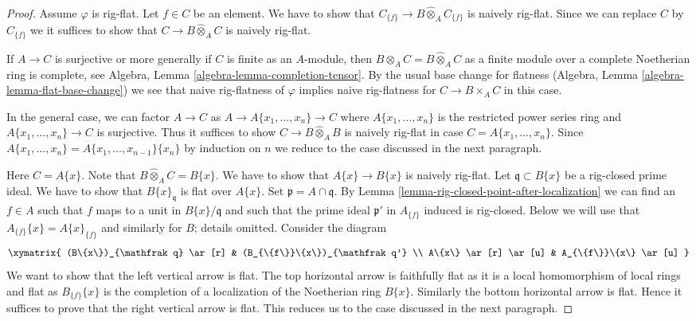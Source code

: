 \begin{proof}
Assume $\varphi$ is rig-flat. Let $f \in C$ be an element.
We have to show that
$C_{\{f\}} \to B \widehat{\otimes}_A C_{\{f\}}$
is naively rig-flat. Since we can replace $C$ by $C_{\{f\}}$
we it suffices to show that $C \to B \widehat{\otimes}_A C$
is naively rig-flat.

\medskip\noindent
If $A \to C$ is surjective or more generally if $C$ is finite as
an $A$-module, then $B \otimes_A C = B \widehat{\otimes}_A C$
as a finite module over a complete Noetherian ring is complete, see
Algebra, Lemma \ref{algebra-lemma-completion-tensor}.
By the usual base change for flatness
(Algebra, Lemma \ref{algebra-lemma-flat-base-change})
we see that naive rig-flatness of $\varphi$ implies naive rig-flatness
for $C \to B \times_A C$ in this case.

\medskip\noindent
In the general case, we can factor $A \to C$ as
$A \to A\{x_1, \ldots, x_n\} \to C$
where $A\{x_1, \ldots, x_n\}$ is the restricted power series ring
and $A\{x_1, \ldots, x_n\} \to C$ is surjective. Thus it
suffices to show $C \to B \widehat{\otimes}_A B$ is naively
rig-flat in case $C = A\{x_1, \ldots, x_n\}$.
Since $A\{x_1, \ldots, x_n\} = A\{x_1, \ldots, x_{n - 1}\}\{x_n\}$
by induction on $n$ we reduce to the case discussed in the next
paragraph.

\medskip\noindent
Here $C = A\{x\}$. Note that $B \widehat{\otimes}_A C = B\{x\}$.
We have to show that $A\{x\} \to B\{x\}$ is naively rig-flat.
Let $\mathfrak q \subset B\{x\}$ be a rig-closed prime ideal.
We have to show that $B\{x\}_{\mathfrak q}$ is flat over $A\{x\}$.
Set $\mathfrak p = A \cap \mathfrak q$.
By Lemma \ref{lemma-rig-closed-point-after-localization}
we can find an $f \in A$ such that
$f$ maps to a unit in $B\{x\}/\mathfrak q$ and such
that the prime ideal $\mathfrak p'$ in $A_{\{f\}}$ induced is rig-closed.
Below we will use that $A_{\{f\}}\{x\} = A\{x\}_{\{f\}}$ and similarly
for $B$; details omitted. Consider the diagram
$$
\xymatrix{
(B\{x\})_{\mathfrak q} \ar[r] &
(B_{\{f\}}\{x\})_{\mathfrak q'} \\
A\{x\} \ar[r] \ar[u] &
A_{\{f\}}\{x\} \ar[u]
}
$$
We want to show that the left vertical arrow is flat.
The top horizontal arrow is faithfully flat as it is a local
homomorphism of local rings and flat as $B_{\{f\}}\{x\}$
is the completion of a localization of the Noetherian ring
$B\{x\}$. Similarly the bottom horizontal arrow is flat.
Hence it suffices to prove that the right vertical arrow is flat.
This reduces us to the case discussed in the next paragraph.


\end{proof}
